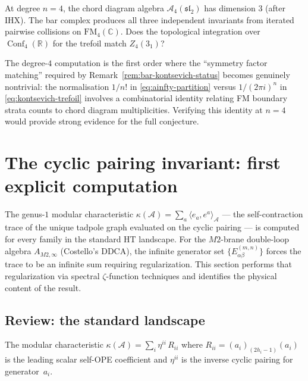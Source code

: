 \documentclass[11pt]{article}
\newcommand{\cA}{\mathcal{A}}
\newcommand{\fsl}{\mathfrak{sl}}
\newcommand{\C}{\mathbb{C}}
\newcommand{\R}{\mathbb{R}}
\newcommand{\FM}{\mathrm{FM}}
\DeclareMathOperator{\Conf}{Conf}
\begin{document}
\begin{question}
\label{q:degree-4-trefoil}
At degree $n = 4$, the chord diagram algebra $\cA_4(\fsl_2)$
has dimension $3$ (after IHX).  The bar complex produces
all three independent invariants from iterated pairwise
collisions on $\FM_4(\C)$.  Does the topological integration
over $\Conf_4(\R)$ for the trefoil match $Z_4(3_1)$?

The degree-$4$ computation is the first order where the
``symmetry factor matching'' required by
Remark~\ref{rem:bar-kontsevich-status} becomes genuinely
nontrivial: the normalisation $1/n!$ in
\eqref{eq:ainfty-partition} versus $1/(2\pi i)^n$ in
\eqref{eq:kontsevich-trefoil} involves a combinatorial
identity relating FM boundary strata counts to chord diagram
multiplicities.  Verifying this identity at $n = 4$ would
provide strong evidence for the full conjecture.
\end{question}



\section{The cyclic pairing invariant: first explicit computation}
\label{sec:cyclic-pairing-invariant}

The genus-$1$ modular characteristic
$\kappa(\cA) = \sum_a \langle e_a, e^a \rangle_\cA$
--- the self-contraction trace of the unique tadpole graph
evaluated on the cyclic pairing --- is computed for every family
in the standard HT landscape.
For the $M2$-brane double-loop algebra $A_{M2,\infty}$
(Costello's DDCA), the infinite generator set
$\{E^{(m,n)}_{\alpha\beta}\}$ forces the trace to be an infinite
sum requiring regularization.  This section performs that
regularization via spectral $\zeta$-function techniques and
identifies the physical content of the result.

\subsection{Review: the standard landscape}

The modular characteristic
$\kappa(\cA) = \sum_i \eta^{ii}\, R_{ii}$
where $R_{ii} = (a_i)_{(2h_i-1)}(a_i)$ is the leading scalar
self-OPE coefficient and $\eta^{ii}$ is the inverse cyclic
pairing for generator~$a_i$.
\end{document}
